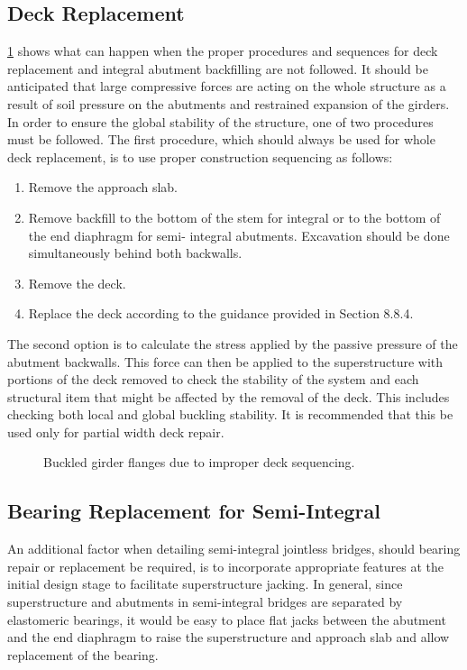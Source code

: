 \subsection{Deck Replacement}
\cref{fig:flanges-buckled} shows what can happen when the proper procedures and sequences for deck replacement and integral
abutment backfilling are not followed. It should be anticipated that large compressive forces are acting on the whole
structure as a result of soil pressure on the abutments and restrained expansion of the girders. In order to ensure the
global stability of the structure, one of two procedures must be followed. The first procedure, which should always be
used for whole deck replacement, is to use proper construction sequencing as follows:
\begin{enumerate}
  \item Remove the approach slab.
  \item Remove backfill to the bottom of the stem for integral or to the bottom of the end diaphragm for semi-
integral abutments. Excavation should be done simultaneously behind both backwalls.
  \item Remove the deck.
  \item Replace the deck according to the guidance provided in Section 8.8.4.
\end{enumerate}

The second option is to calculate the stress applied by the passive pressure of the abutment backwalls. This force
can then be applied to the superstructure with portions of the deck removed to check the stability of the system and
each structural item that might be affected by the removal of the deck. This includes checking both local and global
buckling stability. It is recommended that this be used only for partial width deck repair.

\begin{figure}
  \caption{Buckled girder flanges due to improper deck sequencing.}
  \label{fig:flanges-buckled}
\end{figure}

\subsection{Bearing Replacement for Semi-Integral}
An additional factor when detailing semi-integral jointless bridges, should bearing repair or replacement be
required, is to incorporate appropriate features at the initial design stage to facilitate superstructure jacking. In general,
since superstructure and abutments in semi-integral bridges are separated by elastomeric bearings, it would be easy to
place flat jacks between the abutment and the end diaphragm to raise the superstructure and approach slab and allow
replacement of the bearing.

